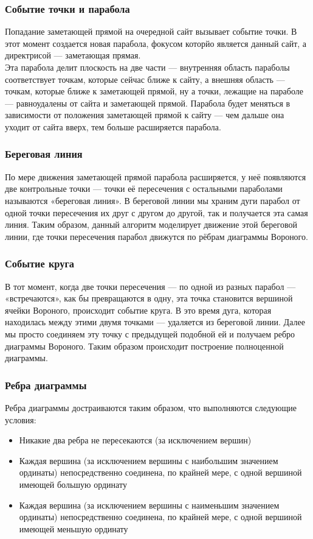 \documentclass[ a4paper]{article}
\begin{document}
\subsubsection{Событие точки и парабола}
Попадание заметающей прямой на очередной сайт вызывает событие точки. В этот момент создается новая парабола, фокусом которйо является данный сайт, а директрисой — заметающая прямая. \\
 Эта парабола делит плоскость на две части — внутренняя область параболы соответствует точкам, которые сейчас ближе к сайту, а внешняя область — точкам, которые ближе к заметающей прямой, ну а точки, лежащие на параболе — равноудалены от сайта и заметающей прямой. Парабола будет меняться в зависимости от положения заметающей прямой к сайту — чем дальше она уходит от сайта вверх, тем больше расширяется парабола.

\subsubsection{Береговая линия}
По мере движения заметающей прямой парабола расширяется, у неё появляются две контрольные точки — точки её пересечения с остальными параболами называются «береговая линия». В береговой линии мы храним дуги парабол от одной точки пересечения их друг с другом до другой, так и получается эта самая линия. Таким образом, данный алгоритм моделирует движение этой береговой линии, где точки пересечения парабол движутся по рёбрам диаграммы Вороного.

\subsubsection{Событие круга}
В тот момент, когда две точки пересечения — по одной из разных парабол — «встречаются», как бы превращаются в одну, эта точка становится вершиной ячейки Вороного, происходит событие круга. В это время дуга, которая находилась между этими двумя точками —  удаляется из береговой линии. Далее мы просто соединяем эту точку с предыдущей подобной ей и получаем ребро диаграммы Вороного. Таким образом происходит построение полноценной диаграммы.

\subsubsection{Ребра диаграммы}
Ребра диаграммы достраиваются таким образом, что выполняются следующие условия:
\begin{itemize}
\item Никакие два ребра не пересекаются (за исключением вершин)
\item Каждая вершина (за исключением вершины с наибольшим значением ординаты) непосредственно соединена, по крайней мере, с одной вершиной имеющей большую ординату
\item Каждая вершина (за исключением вершины с наименьшим значением ординаты) непосредственно соединена, по крайней мере, с одной вершиной имеющей меньшую ординату
\end{itemize}
\end{document}
